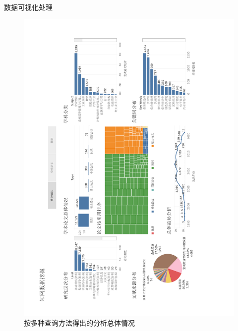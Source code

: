 \documentclass{beamer}
\begin{document}
\begin{frame}{数据可视化处理}
	\vspace{-7mm}
	\begin{figure}[h]
		\centering
		\includegraphics[height=1.4\textheight,trim=110 40 110 40,clip,angle=-90]{pic/data1.pdf}
		\caption{按多种查询方法得出的分析总体情况}
	\end{figure}
\end{frame}
\end{document}
